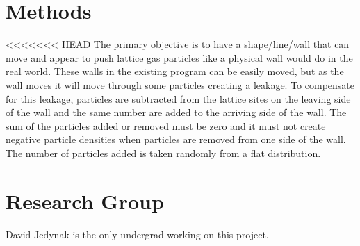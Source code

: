 \documentclass{article}
\begin{document}
\section{Methods}
<<<<<<< HEAD
The primary objective is to have a shape/line/wall that can move and appear to push lattice gas particles like a physical wall would do in the real world. These walls in the existing program can be easily moved, but as the wall moves it will move through some particles creating a leakage. To compensate for this leakage, particles are subtracted from the lattice sites on the leaving side of the wall and the same number are added to the arriving side of the wall. The sum of the particles added or removed must be zero and it must not create negative particle densities when particles are removed from one side of the wall. The number of particles added is taken randomly from a flat distribution. 
\section{Research Group}
David Jedynak is the only undergrad working on this project.
\end{document}
